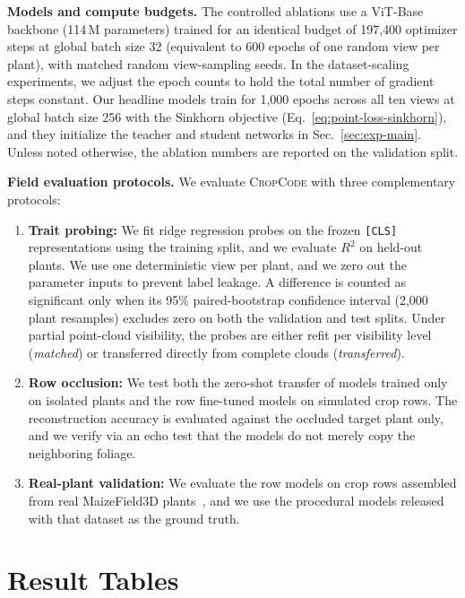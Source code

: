 \documentclass[10pt,twocolumn,letterpaper]{article}
\newcommand{\method}{\textsc{CropCode}}
\begin{document}
\noindent\textbf{Models and compute budgets.}
The controlled ablations use a ViT-Base backbone (114\,M parameters) trained for an identical budget of 197{,}400 optimizer steps at global batch size 32 (equivalent to 600 epochs of one random view per plant), with matched random view-sampling seeds. In the dataset-scaling experiments, we adjust the epoch counts to hold the total number of gradient steps constant. Our headline models train for 1{,}000 epochs across all ten views at global batch size 256 with the Sinkhorn objective (Eq.~\ref{eq:point-loss-sinkhorn}), and they initialize the teacher and student networks in Sec.~\ref{sec:exp-main}. Unless noted otherwise, the ablation numbers are reported on the validation split.

\noindent\textbf{Field evaluation protocols.}
We evaluate \method{} with three complementary protocols:
\begin{enumerate}
  \item \textbf{Trait probing:} We fit ridge regression probes on the frozen \texttt{[CLS]} representations using the training split, and we evaluate $R^2$ on held-out plants. We use one deterministic view per plant, and we zero out the parameter inputs to prevent label leakage. A difference is counted as significant only when its 95\% paired-bootstrap confidence interval (2{,}000 plant resamples) excludes zero on both the validation and test splits. Under partial point-cloud visibility, the probes are either refit per visibility level (\emph{matched}) or transferred directly from complete clouds (\emph{transferred}).
  \item \textbf{Row occlusion:} We test both the zero-shot transfer of models trained only on isolated plants and the row fine-tuned models on simulated crop rows. The reconstruction accuracy is evaluated against the occluded target plant only, and we verify via an echo test that the models do not merely copy the neighboring foliage.
  \item \textbf{Real-plant validation:} We evaluate the row models on crop rows assembled from real MaizeField3D plants~\citep{maizefield3d2025}, and we use the procedural models released with that dataset as the ground truth.
\end{enumerate}

\section{Result Tables}
\label{app:tables}
\end{document}

